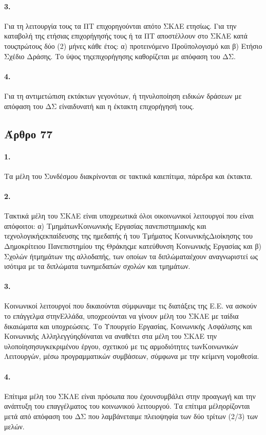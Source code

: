 \documentclass[a4paper,oneside, 10pt]{book}
\begin{document}
\paragraph { 3. } Για τη λειτουργία τους τα ΠΤ επιχορηγούνται απότο ΣΚΛΕ ετησίως. Για την καταβολή της ετήσιας επιχορήγησής τους ή τα ΠΤ αποστέλλουν στο ΣΚΛΕ κατά τουςπρώτους δύο (2) μήνες κάθε έτος: α) προτεινόμενο Προϋπολογισμό και β) Ετήσιο Σχέδιο Δράσης. Το ύψος τηςεπιχορήγησης καθορίζεται με απόφαση του ΔΣ.
\paragraph { 4. } Για τη αντιμετώπιση εκτάκτων γεγονότων, ή τηνυλοποίηση ειδικών δράσεων με απόφαση του ΔΣ είναιδυνατή και η έκτακτη επιχορήγησή τους.
\subsection*{ Άρθρο 77 }
\paragraph { 1. } Τα μέλη του Συνδέσμου διακρίνονται σε τακτικά καιεπίτιμα, πάρεδρα και έκτακτα.
\paragraph { 2. } Τακτικά μέλη του ΣΚΛΕ είναι υποχρεωτικά όλοι οικοινωνικοί λειτουργοί που είναι απόφοιτοι: α) ΤμημάτωνΚοινωνικής Εργασίας πανεπιστημιακής και τεχνολογικήςεκπαίδευσης της ημεδαπής ή του Τμήματος ΚοινωνικήςΔιοίκησης του Δημοκρίτειου Πανεπιστημίου της Θράκηςμε κατεύθυνση Κοινωνικής Εργασίας και β) Σχολών ήτμημάτων της αλλοδαπής, των οποίων τα διπλώματαέχουν αναγνωριστεί ως ισότιμα με τα διπλώματα τωνημεδαπών σχολών και τμημάτων.
\paragraph { 3. } Κοινωνικοί λειτουργοί που δικαιούνται σύμφωναμε τις διατάξεις της Ε.Ε. να ασκούν το επάγγελμα στηνΕλλάδα, υποχρεούνται να γίνουν μέλη του ΣΚΛΕ με ταίδια δικαιώματα και υποχρεώσεις. Το Υπουργείο Εργασίας, Κοινωνικής Ασφάλισης και Κοινωνικής Αλληλεγγύηςδύναται να αναθέτει στα μέλη του ΣΚΛΕ την υλοποίησησυγκεκριμένου έργου, σχετικού με τις αρμοδιότητες τωνΚοινωνικών Λειτουργών, μέσω προγραμματικών συμβάσεων, σύμφωνα με την κείμενη νομοθεσία.
\paragraph { 4. } Επίτιμα μέλη του ΣΚΛΕ είναι πρόσωπα που έχουνσυμβάλει στην προαγωγή και την ανάπτυξη του επαγγέλματος του κοινωνικού λειτουργού. Τα επίτιμα μέληορίζονται μετά από απόφαση του ΔΣ που λαμβάνεταιμε πλειοψηφία των δύο τρίτων (2/3) των μελών.
\end{document}
